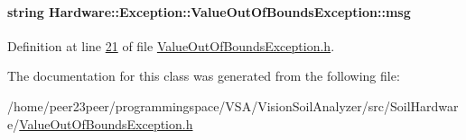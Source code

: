 \paragraph[{msg}]{\setlength{\rightskip}{0pt plus 5cm}string Hardware\+::\+Exception\+::\+Value\+Out\+Of\+Bounds\+Exception\+::msg\hspace{0.3cm}{\ttfamily [private]}}\label{class_hardware_1_1_exception_1_1_value_out_of_bounds_exception_a9a118d00116fbc47c0eaa7e502a8ea68}


Definition at line \hyperlink{_value_out_of_bounds_exception_8h_source_l00021}{21} of file \hyperlink{_value_out_of_bounds_exception_8h_source}{Value\+Out\+Of\+Bounds\+Exception.\+h}.



The documentation for this class was generated from the following file\+:\begin{DoxyCompactItemize}
\item 
/home/peer23peer/programmingspace/\+V\+S\+A/\+Vision\+Soil\+Analyzer/src/\+Soil\+Hardware/\hyperlink{_value_out_of_bounds_exception_8h}{Value\+Out\+Of\+Bounds\+Exception.\+h}\end{DoxyCompactItemize}
